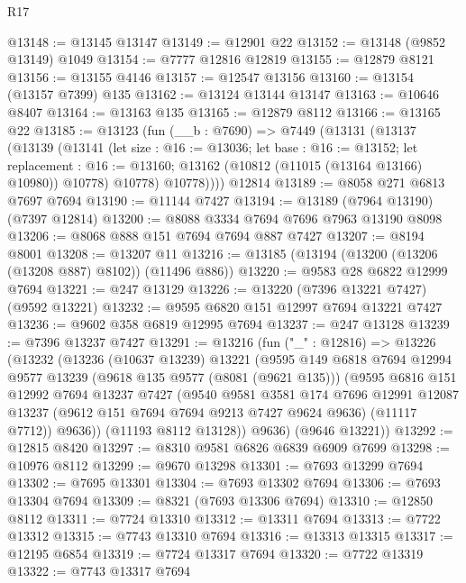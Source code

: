 \begin{lexlean}{R17}
\begin{coremodule}
@13148 := @13145 @13147
@13149 := @12901 @22
@13152 := @13148 (@9852 @13149) @1049
@13154 := @7777 @12816 @12819
@13155 := @12879 @8121
@13156 := @13155 @4146
@13157 := @12547 @13156
@13160 := @13154 (@13157 @7399) @135
@13162 := @13124 @13144 @13147
@13163 := @10646 @8407
@13164 := @13163 @135
@13165 := @12879 @8112
@13166 := @13165 @22
@13185 := @13123
    (fun (__b : @7690) =>
    @7449
      (@13131
        (@13137
          (@13139
            (@13141
              (let size : @16 := @13036;
              let base : @16 := @13152;
              let replacement : @16 := @13160;
              @13162 (@10812 (@11015 (@13164 @13166) @10980)) @10778)
              @10778)
            @10778))))
    @12814
@13189 := @8058 @271 @6813 @7697 @7694
@13190 := @11144 @7427
@13194 := @13189 (@7964 @13190) (@7397 @12814)
@13200 := @8088 @3334 @7694 @7696 @7963 @13190 @8098
@13206 := @8068 @888 @151 @7694 @7694 @887 @7427
@13207 := @8194 @8001
@13208 := @13207 @11
@13216 := @13185 (@13194 (@13200 (@13206 (@13208 @887) @8102)) (@11496 @886))
@13220 := @9583 @28 @6822 @12999 @7694
@13221 := @247 @13129
@13226 := @13220 (@7396 @13221 @7427) (@9592 @13221)
@13232 := @9595 @6820 @151 @12997 @7694 @13221 @7427
@13236 := @9602 @358 @6819 @12995 @7694
@13237 := @247 @13128
@13239 := @7396 @13237 @7427
@13291 := @13216
    (fun ("_" : @12816) =>
    @13226
      (@13232
        (@13236
          (@10637 @13239)
          @13221
          (@9595
            @149
            @6818
            @7694
            @12994
            @9577
            @13239
            (@9618 @135 @9577 (@8081 (@9621 @135)))
            (@9595
              @6816
              @151
              @12992
              @7694
              @13237
              @7427
              (@9540
                @9581
                @3581
                @174
                @7696
                @12991
                @12087
                @13237
                (@9612 @151 @7694 @7694 @9213 @7427 @9624 @9636)
                (@11117 @7712))
              @9636))
          (@11193 @8112 @13128))
        @9636)
      (@9646 @13221))
@13292 := @12815 @8420
@13297 := @8310 @9581 @6826 @6839 @6909 @7699
@13298 := @10976 @8112
@13299 := @9670 @13298
@13301 := @7693 @13299 @7694
@13302 := @7695 @13301
@13304 := @7693 @13302 @7694
@13306 := @7693 @13304 @7694
@13309 := @8321 (@7693 @13306 @7694)
@13310 := @12850 @8112
@13311 := @7724 @13310
@13312 := @13311 @7694
@13313 := @7722 @13312
@13315 := @7743 @13310 @7694
@13316 := @13313 @13315
@13317 := @12195 @6854
@13319 := @7724 @13317 @7694
@13320 := @7722 @13319
@13322 := @7743 @13317 @7694

\end{coremodule}
\end{lexlean}
